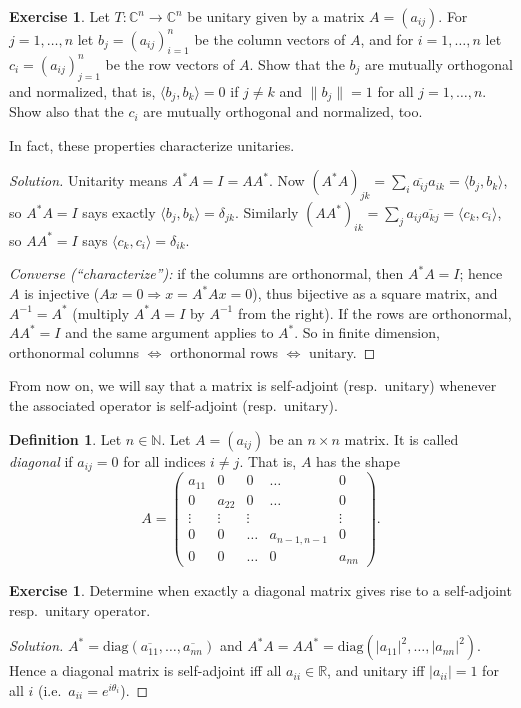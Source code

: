 \documentclass[11pt,a4paper]{article}
\numberwithin{equation}{section}
\newcommand{\N}{\mathbb{N}}
\newcommand{\R}{\mathbb{R}}
\newcommand{\C}{\mathbb{C}}
\newcommand{\ip}[2]{\langle #1, #2\rangle}
\newcommand{\conj}[1]{\overline{#1}}
\theoremstyle{plain}
\theoremstyle{definition}
\newtheorem{definition}[theorem]{Definition}
\newtheorem{exercise}[theorem]{Exercise}
\theoremstyle{plain}
\theoremstyle{definition}
\newenvironment{solution}{\begin{proof}[Solution]}{\end{proof}}
\begin{document}
\begin{exercise}\label{exo:unitcols}
Let $T:\C^n\to\C^n$ be unitary given by a matrix $A=(a_{ij})$. For $j=1,\dots,n$ let
$b_j=(a_{ij})_{i=1}^n$ be the column vectors of $A$, and for $i=1,\dots,n$ let
$c_i=(a_{ij})_{j=1}^n$ be the row vectors of $A$. Show that the $b_j$ are mutually
orthogonal and normalized, that is, $\ip{b_j}{b_k}=0$ if $j\ne k$ and $\|b_j\|=1$ for all
$j=1,\dots,n$. Show also that the $c_i$ are mutually orthogonal and normalized, too.

In fact, these properties characterize unitaries.
\end{exercise}
\begin{solution}
Unitarity means $A^*A=I=AA^*$. Now
$(A^*A)_{jk}=\sum_i\conj{a_{ij}}a_{ik}=\ip{b_j}{b_k}$, so $A^*A=I$ says exactly
$\ip{b_j}{b_k}=\delta_{jk}$. Similarly $(AA^*)_{ik}=\sum_ja_{ij}\conj{a_{kj}}=\ip{c_k}{c_i}$,
so $AA^*=I$ says $\ip{c_k}{c_i}=\delta_{ik}$.

\emph{Converse (``characterize''):} if the columns are orthonormal, then $A^*A=I$; hence
$A$ is injective ($Ax=0\Rightarrow x=A^*Ax=0$), thus bijective as a square matrix, and
$A^{-1}=A^*$ (multiply $A^*A=I$ by $A^{-1}$ from the right). If the rows are orthonormal,
$AA^*=I$ and the same argument applies to $A^*$. So in finite dimension, orthonormal
columns $\iff$ orthonormal rows $\iff$ unitary.
\end{solution}

From now on, we will say that a matrix is self-adjoint (resp.\ unitary) whenever the
associated operator is self-adjoint (resp.\ unitary).

\begin{definition}
Let $n\in\N$. Let $A=(a_{ij})$ be an $n\times n$ matrix. It is called \emph{diagonal} if
$a_{ij}=0$ for all indices $i\ne j$. That is, $A$ has the shape
\[
A=\begin{pmatrix}a_{11}&0&0&\dots&0\\0&a_{22}&0&\dots&0\\\vdots&\vdots&\vdots&&\vdots\\
0&0&\dots&a_{n-1,n-1}&0\\0&0&\dots&0&a_{nn}\end{pmatrix}.
\]
\end{definition}

\begin{exercise}
Determine when exactly a diagonal matrix gives rise to a self-adjoint resp.\ unitary operator.
\end{exercise}
\begin{solution}
$A^*=\mathrm{diag}(\conj{a_{11}},\dots,\conj{a_{nn}})$ and
$A^*A=AA^*=\mathrm{diag}(|a_{11}|^2,\dots,|a_{nn}|^2)$. Hence a diagonal matrix is
self-adjoint iff all $a_{ii}\in\R$, and unitary iff $|a_{ii}|=1$ for all $i$
(i.e.\ $a_{ii}=e^{i\theta_i}$).
\end{solution}
\end{document}
